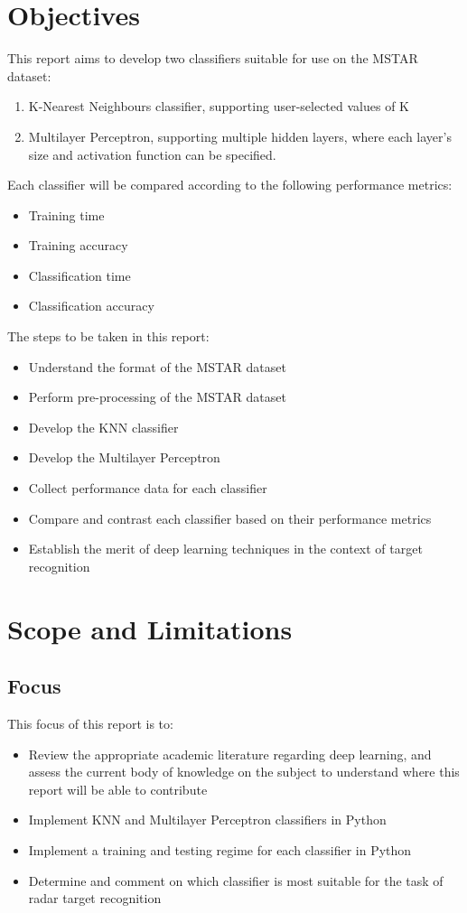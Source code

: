 \section{Objectives}

This report aims to develop two classifiers suitable for use on the MSTAR dataset: 

\begin{enumerate}
	\item K-Nearest Neighbours classifier, supporting user-selected values of K
	\item Multilayer Perceptron, supporting multiple hidden layers, where each layer's size and activation function can be specified.
\end{enumerate}

Each classifier will be compared according to the following performance metrics:
\begin{itemize}
	\item Training time
	\item Training accuracy
	\item Classification time
	\item Classification accuracy
\end{itemize}

The steps to be taken in this report:
\begin{itemize}
	\item Understand the format of the MSTAR dataset
	\item Perform pre-processing of the MSTAR dataset
	\item Develop the KNN classifier
	\item Develop the Multilayer Perceptron
	\item Collect performance data for each classifier
	\item Compare and contrast each classifier based on their performance metrics
	\item Establish the merit of deep learning techniques in the context of target recognition
\end{itemize}



\section{Scope and Limitations}

\subsection{Focus}
This focus of this report is to:
\begin{itemize}
	\item Review the appropriate academic literature regarding deep learning, and assess the current body of knowledge on the subject to understand where this report will be able to contribute
	\item Implement KNN and Multilayer Perceptron classifiers in Python
	\item Implement a training and testing regime for each classifier in Python
	\item Determine and comment on which classifier is most suitable for the task of radar target recognition
\end{itemize}
